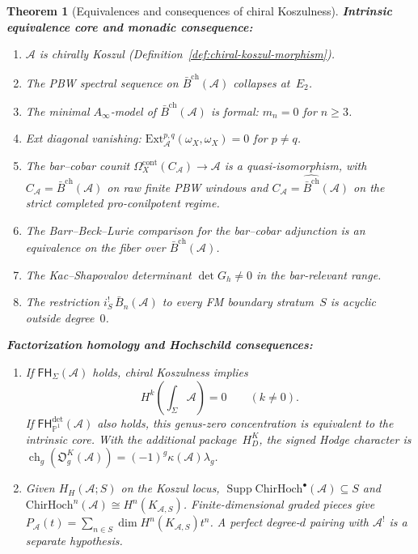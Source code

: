 \documentclass[11pt,reqno]{amsart}
\newtheorem{theorem}{Theorem}[section]
\theoremstyle{definition}
\theoremstyle{remark}
\newcommand{\cA}{\mathcal{A}}
\newcommand{\barB}{\bar{B}}
\newcommand{\barBgeom}{\bar{B}^{\mathrm{ch}}}
\newcommand{\Ext}{\mathrm{Ext}}
\newcommand{\ChirHoch}{\mathrm{ChirHoch}}
\numberwithin{equation}{section}
\begin{document}
\begin{theorem}[Equivalences and consequences of chiral Koszulness]
\smallskip
\noindent\textbf{Intrinsic equivalence core and monadic consequence:}
\begin{enumerate}[leftmargin=2.8em]
\item[\textup{(i)}] $\cA$ is chirally Koszul
 (Definition~\ref{def:chiral-koszul-morphism}).
\item[\textup{(ii)}] The PBW spectral sequence on $\barBgeom(\cA)$ collapses
 at~$E_2$.
\item[\textup{(iii)}] The minimal $A_\infty$-model of $\barBgeom(\cA)$ is formal:
 $m_n = 0$ for $n \ge 3$.
\item[\textup{(iv)}] Ext diagonal vanishing:
 $\Ext^{p,q}_\cA(\omega_X,\omega_X) = 0$ for $p \ne q$.
\item[\textup{(v)}] The bar--cobar counit
 $\Omega_X^{\mathrm{cont}}(C_\cA) \to \cA$ is a
 quasi-isomorphism, with $C_\cA=\barBgeom(\cA)$ on raw finite PBW
 windows and $C_\cA=\widehat{\barBgeom}(\cA)$ on the strict
 completed pro-conilpotent regime.
\item[\textup{(vi)}] The Barr--Beck--Lurie comparison for the bar--cobar
 adjunction is an equivalence on the fiber
 over $\barBgeom(\cA)$.
\item[\textup{(ix)}] The Kac--Shapovalov determinant $\det G_h \neq 0$ in the
 bar-relevant range.
\item[\textup{(x)}] The restriction $i_S^!\,\barB_n(\cA)$ to every FM boundary
 stratum~$S$ is acyclic outside degree~$0$.
\end{enumerate}

\smallskip
\noindent\textbf{Factorization homology and Hochschild consequences:}
\begin{enumerate}[label=\textup{(\roman*)},leftmargin=2.4em,start=7]
\item If $\mathsf{FH}_{\Sigma}(\cA)$ holds, chiral Koszulness
 implies
 \[
 H^k\!\left(\textstyle\int_{\Sigma}\cA\right)=0
 \qquad (k\neq 0).
 \]
 If $\mathsf{FH}^{\mathrm{det}}_{\mathbb P^1}(\cA)$ also holds,
 this genus-zero concentration is equivalent to the intrinsic core.
 With the additional package~$H_D^K$, the signed Hodge character is
 $\operatorname{ch}_g(\mathfrak O_g^K(\cA))
 =(-1)^g\kappa(\cA)\lambda_g$.
\item Given $H_H(\cA;S)$ on the Koszul locus,
 $\operatorname{Supp}\ChirHoch^\bullet(\cA)\subseteq S$ and
 $\ChirHoch^n(\cA)\cong H^n(K_{\cA,S})$.  Finite-dimensional
 graded pieces give
 $P_\cA(t)=\sum_{n\in S}\dim H^n(K_{\cA,S})t^n$.
 A perfect degree-$d$ pairing with $\cA^!$ is a separate hypothesis.
\end{enumerate}


\end{theorem}
\end{document}
